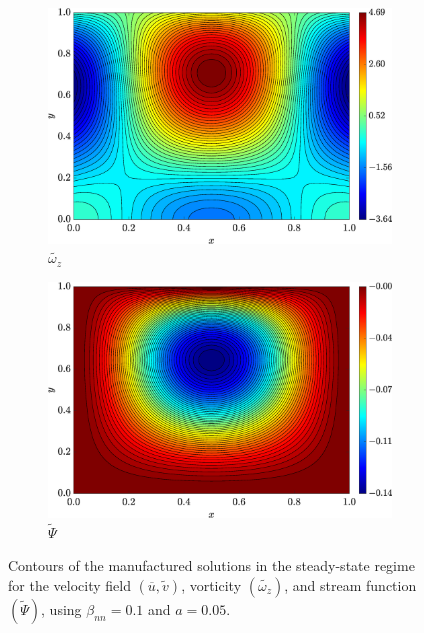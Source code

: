 \documentclass[preprint, 12pt]{elsarticle}
\begin{document}
\begin{figure}[H]
\begin{subfigure}[b]{.46\textwidth}
        \includegraphics[width=\textwidth]{Exact_Map_NormErr_2nd_Betann_0.1_Re_1_Wi_1_epsilon_0_xi_0_alphaG_0_Dt_1e-06_at_0.05_tipsim_1_MMS_12_Wz.eps}
        \caption{$\widetilde{\omega_{z}}$}
        \label{fig_solexawzstreamlineCase1}
    \end{subfigure}
    \vspace{0.2cm}
    \begin{subfigure}[b]{.46\textwidth}
        \includegraphics[width=\textwidth]{Exact_Map_NormErr_2nd_Betann_0.1_Re_1_Wi_1_epsilon_0_xi_0_alphaG_0_Dt_1e-06_at_0.05_tipsim_1_MMS_12_Psi.eps}
        \caption{$\widetilde{\Psi}$}
        \label{fig_solexapsistreamlineCase1}
    \end{subfigure}
    \vspace{0.02cm}
    \caption{Contours of the manufactured solutions in the steady-state regime for the velocity field $(\overline{u},\widetilde{v})$, vorticity $(\widetilde{\omega_{z}})$, and stream function $(\widetilde{\Psi})$, using $\beta_{nn}=0.1$ and $a = 0.05$.\label{fig_U_m_u_sol_num_case1streamline2}}
\end{figure}
\end{document}
